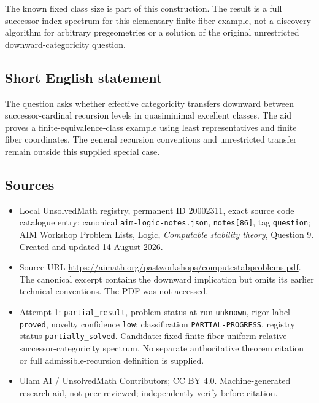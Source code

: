 \documentclass[11pt]{article}
\begin{document}
The known fixed class size is part of this construction. The result is a full successor-index spectrum for this elementary finite-fiber example, not a discovery algorithm for arbitrary pregeometries or a solution of the original unrestricted downward-categoricity question.
\subsection{Short English statement}
The question asks whether effective categoricity transfers downward between successor-cardinal recursion levels in quasiminimal excellent classes. The aid proves a finite-equivalence-class example using least representatives and finite fiber coordinates. The general recursion conventions and unrestricted transfer remain outside this supplied special case.
\subsection{Sources}
\begin{itemize}
\item Local UnsolvedMath registry, permanent ID 20002311, exact source code catalogue entry; canonical \texttt{aim-logic-notes.json}, \texttt{notes[86]}, tag \texttt{question}; AIM Workshop Problem Lists, Logic, \emph{Computable stability theory}, Question 9. Created and updated 14 August 2026.
\item Source URL \url{https://aimath.org/pastworkshops/computestabproblems.pdf}. The canonical excerpt contains the downward implication but omits its earlier technical conventions. The PDF was not accessed.
\item Attempt 1: \texttt{partial\_result}, problem status at run \texttt{unknown}, rigor label \texttt{proved}, novelty confidence \texttt{low}; classification \texttt{PARTIAL-PROGRESS}, registry status \texttt{partially\_solved}. Candidate: fixed finite-fiber uniform relative successor-categoricity spectrum. No separate authoritative theorem citation or full admissible-recursion definition is supplied.
\item Ulam AI / UnsolvedMath Contributors; CC BY 4.0. Machine-generated research aid, not peer reviewed; independently verify before citation.
\end{itemize}
\end{document}

